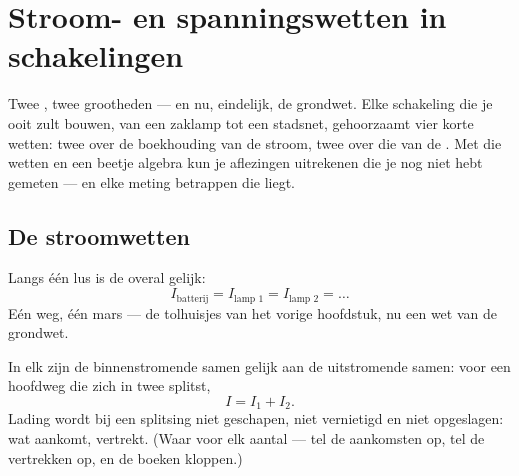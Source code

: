 \chapter{Stroom- en spanningswetten in schakelingen}\label{ch:g8:circuit-laws}

Twee , twee grootheden --- en nu, eindelijk, de grondwet. Elke
schakeling die je ooit zult bouwen, van een zaklamp tot een stadsnet,
gehoorzaamt vier korte wetten: twee over de boekhouding van de stroom,
twee over die van de . Met die wetten en een beetje
algebra kun je aflezingen uitrekenen die je nog niet hebt gemeten ---
en elke meting betrappen die liegt.

\section{De stroomwetten}

\begin{proposition}\label{prop:g8:circuit-laws:seriesI}
Langs één lus is de  overal gelijk:
\[
I_{\text{batterij}} = I_{\text{lamp 1}} = I_{\text{lamp 2}} =
\dots
\]
Eén weg, één mars --- de tolhuisjes van het vorige hoofdstuk, nu een
wet van de grondwet.
\end{proposition}

\begin{proposition}[De knooppuntwet]\label{prop:g8:circuit-laws:junction}
In elk  zijn de binnenstromende  samen
gelijk aan de uitstromende  samen: voor een hoofdweg die
zich in twee  splitst,
\[
I = I_1 + I_2 .
\]
Lading wordt bij een splitsing niet geschapen, niet vernietigd en niet
opgeslagen: wat aankomt, vertrekt. (Waar voor elk aantal
 --- tel de aankomsten op, tel de vertrekken op, en de
boeken kloppen.)
\end{proposition}

